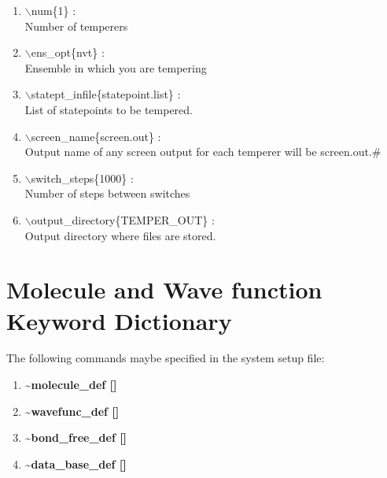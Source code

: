 \documentclass[12pt,titlepage]{article}
\begin{document}
\begin{enumerate}

 \vspace{0.15in} 
 \item  $\backslash$num\{1\} : \\
   Number of temperers

 \vspace{0.15in} 
 \item  $\backslash$ens\_opt\{nvt\} : \\
   Ensemble in which you are tempering

 \vspace{0.15in} 
 \item  $\backslash$statept\_infile\{statepoint.list\} : \\
   List of statepoints to be tempered.

 \vspace{0.15in} 
 \item  $\backslash$screen\_name\{screen.out\} : \\
   Output name of any screen output for each temperer will be screen.out.\#

 \vspace{0.15in} 
 \item  $\backslash$switch\_steps\{1000\} : \\
   Number of steps between switches

 \vspace{0.15in} 
 \item  $\backslash$output\_directory\{TEMPER\_OUT\} : \\
   Output directory where files are stored.

\end{enumerate}
\newpage



\section{\bf Molecule and Wave function Keyword Dictionary} 

The following commands maybe specified in the system setup file:
\begin{enumerate}
\item {\bf \~{}molecule\_def []}
\item {\bf \~{}wavefunc\_def []}
\item {\bf \~{}bond\_free\_def []}
\item {\bf \~{}data\_base\_def []}
\end{enumerate}
\end{document}
